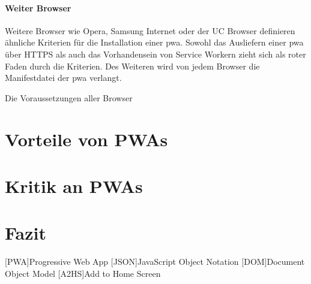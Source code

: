 \documentclass[12pt, parskip=half]{scrartcl}       %
\begin{document}
\paragraph{Weiter Browser}
Weitere Browser wie Opera\cite{devopera_pwainstallcriteria}, Samsung Internet\cite{samsung_pwainstallcriteria} oder der UC Browser\cite{ucweb_pwainstallcriteria} definieren ähnliche Kriterien für die Installation einer \ac{pwa}.
Sowohl das Ausliefern einer \ac{pwa} über HTTPS als auch das Vorhandensein von Service Workern zieht sich als roter Faden durch die Kriterien.
Des Weiteren wird von jedem Browser die Manifestdatei der \ac{pwa} verlangt.

Die Voraussetzungen aller Browser %

\section{Vorteile von PWAs}

\section{Kritik an PWAs}

\section{Fazit}

\newpage


\begin{acronym}
  [PWA]{Progressive Web App}
  [JSON]{JavaScript Object Notation}
  [DOM]{Document Object Model}
  [A2HS]{Add to Home Screen}
\end{acronym}

\printbibliography
\end{document}
